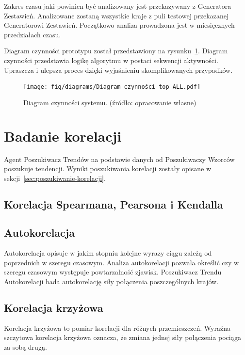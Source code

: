 \documentclass[11pt]{report}
\begin{document}
    Zakres czasu jaki powinien być analizowany jest przekazywany z Generatora Zestawień.
    Analizowane zostaną wszystkie kraje z puli testowej przekazanej Generatorowi Zestawień.
    Początkowo analiza prowadzona jest w miesięcznych przedziałach czasu.

    Diagram czynności prototypu został przedstawiony na rysunku~\ref{fig:diagram_czynności_top}.
    Diagram czynności przedstawia logikę algorytmu w postaci sekwencji aktywności.
    Upraszcza i ulepsza proces dzięki wyjaśnieniu skomplikowanych przypadków.

    \begin{figure}[!ht]
        \centering
        \texttt{[image: fig/diagrams/Diagram czynności top ALL.pdf]}
        \caption{Diagram czynności systemu. (źródło: opracowanie własne)}
        \label{fig:diagram_czynności_top}
    \end{figure}


    \section{Badanie korelacji}
    Agent Poszukiwacz Trendów na podstawie danych od Poszukiwaczy Wzorców poszukuje tendencji.
    Wyniki poszukiwania korelacji zostały opisane w sekcji~\ref{sec:poszukiwanie-korelacji}.

    \subsection{Korelacja Spearmana, Pearsona i Kendalla}

    \subsection{Autokorelacja}
    Autokorelacja opisuje w jakim stopniu kolejne wyrazy ciągu zależą od poprzednich w szeregu czasowym.
    Analiza autokorelacji pozwala określić czy w szeregu czasowym występuje powtarzalność zjawisk.
    Poszukiwacz Trendu Autokorelacji bada autokorelację siły połączenia poszczególnych krajów.

    \subsection{Korelacja krzyżowa}
    Korelacja krzyżowa to pomiar korelacji dla różnych przemieszczeń.
    Wyraźna szczytowa korelacja krzyżowa oznacza, że zmiana jednej siły połączenia pociąga za sobą drugą.
\end{document}
